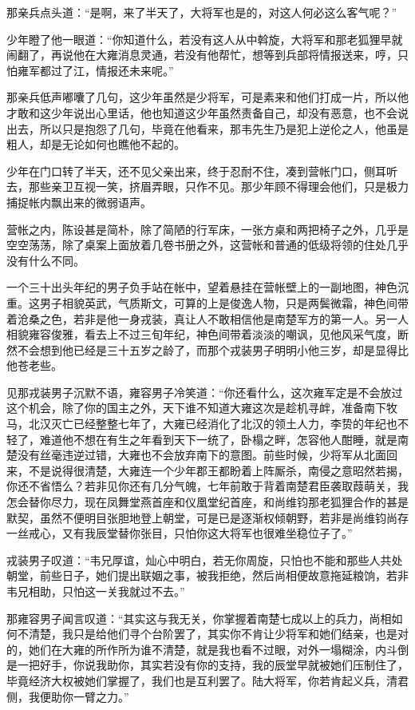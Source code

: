 那亲兵点头道：“是啊，来了半天了，大将军也是的，对这人何必这么客气呢？”

少年瞪了他一眼道：“你知道什么，若没有这人从中斡旋，大将军和那老狐狸早就闹翻了，再说他在大雍消息灵通，若没有他帮忙，想等到兵部将情报送来，哼，只怕雍军都过了江，情报还未来呢。”

那亲兵低声嘟囔了几句，这少年虽然是少将军，可是素来和他们打成一片，所以他才敢和这少年说出心里话，他也知道这少年虽然责备自己，却没有恶意，也不会说出去，所以只是抱怨了几句，毕竟在他看来，那韦先生乃是犯上逆伦之人，他虽是粗人，却是无论如何也瞧他不起的。

少年在门口转了半天，还不见父亲出来，终于忍耐不住，凑到营帐门口，侧耳听去，那些亲卫互视一笑，挤眉弄眼，只作不见。那少年顾不得理会他们，只是极力捕捉帐内飘出来的微弱语声。

营帐之内，陈设甚是简朴，除了简陋的行军床，一张方桌和两把椅子之外，几乎是空空荡荡，除了桌案上面放着几卷书册之外，这营帐和普通的低级将领的住处几乎没有什么不同。

一个三十出头年纪的男子负手站在帐中，望着悬挂在营帐壁上的一副地图，神色沉重。这男子相貌英武，气质斯文，可算的上是俊逸人物，只是两鬓微霜，神色间带着沧桑之色，若非是他一身戎装，真让人不敢相信他是南楚军方的第一人。另一人相貌雍容俊雅，看去上不过三旬年纪，神色间带着淡淡的嘲讽，见他风采气度，断然不会想到他已经是三十五岁之龄了，而那个戎装男子明明小他三岁，却是显得比他苍老些。

见那戎装男子沉默不语，雍容男子冷笑道：“你还看什么，这次雍军定是不会放过这个机会，除了你的国主之外，天下谁不知道大雍这次是趁机寻衅，准备南下牧马，北汉灭亡已经整整七年了，大雍已经消化了北汉的领土人力，李贽的年纪也不轻了，难道他不想在有生之年看到天下一统了，卧榻之畔，怎容他人酣睡，就是南楚没有丝毫违逆过错，大雍也不会放弃南下的意图。前些时候，少将军从北面回来，不是说得很清楚，大雍连一个少年郡王都盼着上阵厮杀，南侵之意昭然若揭，你还不省悟么？若非见你还有几分气魄，七年前敢于背着南楚君臣袭取葭萌关，我怎会替你尽力，现在凤舞堂燕首座和仪凰堂纪首座，和尚维钧那老狐狸合作的甚是默契，虽然不便明目张胆地登上朝堂，可是已是逐渐权倾朝野，若非是尚维钧尚存一丝戒心，又有我辰堂替你张目，只怕你这大将军也很难坐稳位子了。”

戎装男子叹道：“韦兄厚谊，灿心中明白，若无你周旋，只怕也不能和那些人共处朝堂，前些日子，她们提出联姻之事，被我拒绝，然后尚相便故意拖延粮饷，若非韦兄相助，只怕这一关我就过不去。”

那雍容男子闻言叹道：“其实这与我无关，你掌握着南楚七成以上的兵力，尚相如何不清楚，我只是给他们寻个台阶罢了，其实你不肯让少将军和她们结亲，也是对的，她们在大雍的所作所为谁不清楚，就是我也看不过眼，对外一塌糊涂，内斗倒是一把好手，你说我助你，其实若没有你的支持，我的辰堂早就被她们压制住了，毕竟经济大权被她们掌握了，我们也是互利罢了。陆大将军，你若肯起义兵，清君侧，我便助你一臂之力。”

